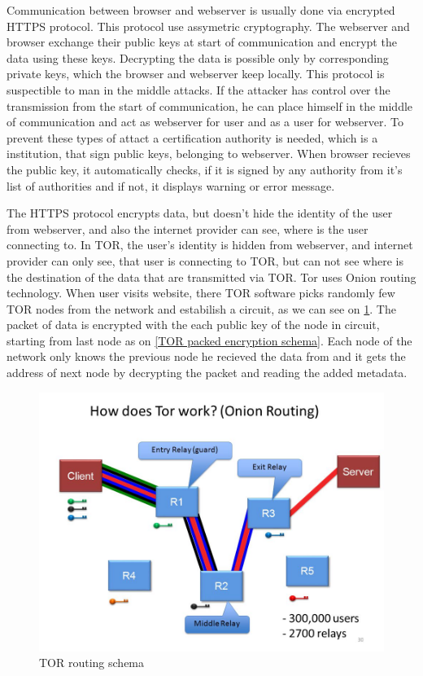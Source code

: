 \documentclass[
  digital, %
  table,   %
  lof,     %
  lot,     %
  oneside
]{fithesis3}
\begin{document}
Communication between browser and webserver is usually done via encrypted HTTPS protocol.
This protocol use assymetric cryptography. The webserver and browser exchange their public keys at start of communication
and encrypt the data using these keys. Decrypting the data is possible only by corresponding private keys,
which the browser and webserver keep locally. This protocol is suspectible to man in the middle attacks.
If the attacker has control over the transmission from the start of communication, he can place himself in the middle
 of communication and act as webserver for user and as a user for webserver. To prevent these types of attact
 a certification authority is needed, which is a institution, that sign public keys, belonging to webserver.
 When browser recieves the public key, it automatically checks, if it is signed by any authority from it's list of authorities
 and if not, it displays warning or error message.
 
The HTTPS protocol encrypts data, but doesn't hide the identity of the user from webserver,
 and also the internet provider can see, where is the user connecting to.
 In TOR, the user's identity is hidden from webserver, and internet provider can only see, that user is connecting to TOR,
 but can not see where is the destination of the data that are transmitted via TOR.
 Tor uses Onion routing technology. When user visits website, there TOR software picks randomly few TOR nodes from the network
 and estabilish a circuit, as we can see on \ref{TOR routing schema}. 
 The packet of data is encrypted with the each public key of the node in circuit, starting from last node as on \ref{TOR packed encryption schema}.
 Each node of the network only knows the previous node he recieved the data from and it gets the address 
 of next node by decrypting the packet and reading the added metadata.
 
 \begin{figure}[!htb]
    \centering
    \includegraphics[width=1\textwidth]{tor-prejate}
    \caption{TOR routing schema}
    \label{TOR routing schema}
\end{figure}
 
\end{document}
